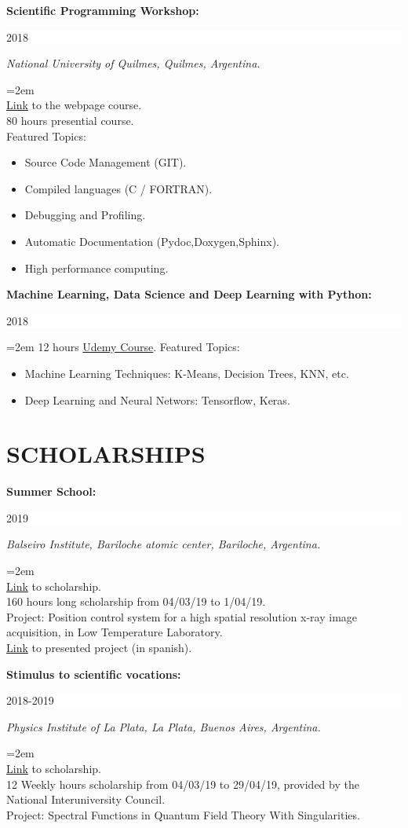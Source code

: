 \documentclass[paper=letter,fontsize=11pt]{scrartcl} %
\newcommand{\sepspace}{\vspace*{1em}}		%
\newcommand{\NewPart}[2]{\section*{\uppercase{#1} \small \normalfont #2}}
\newcommand{\EducationEntry}[4]{
		\noindent \textbf{#1} \hfill      %
		\colorbox{White}{%
			\parbox{6em}{%
			\hfill\color{Black}#2}} \par  %
		\noindent \textit{#3} \par        %
		\noindent\hangindent=2em\hangafter=0 \small #4 %
		\normalsize \par}
\begin{document}
\EducationEntry{Scientific Programming Workshop:
}{2018}{National University of Quilmes, Quilmes, Argentina.}{\\
{\href{https://wtpc.github.io/}{Link}} to the webpage course.\\
80 hours presential course.\\
Featured Topics:



\begin{itemize}
	\item{Source Code Management (GIT).}
	\item{Compiled languages (C / FORTRAN).}
	\item{Debugging and Profiling.}
	\item{Automatic Documentation (Pydoc,Doxygen,Sphinx).}
	\item{High performance computing.}
	\end{itemize}}
\sepspace

\EducationEntry{Machine Learning, Data Science and Deep Learning with Python:
}{2018}{}{
12 hours {\href{https://www.udemy.com/data-science-and-machine-learning-with-python-hands-on/}{Udemy Course}}.
Featured Topics:
\begin{itemize}
\item{Machine Learning Techniques: K-Means, Decision Trees, KNN, etc. }
\item{Deep Learning and Neural Networs: Tensorflow, Keras.}
\end{itemize}
}


\sepspace

\NewPart{Scholarships}{}

\EducationEntry{Summer School:}
{2019}
{Balseiro Institute, Bariloche atomic center, Bariloche, Argentina.}{\\
{\href{http://www.ib.edu.ar/component/k2/item/452-becas-de-verano.html}{Link}} to scholarship.
\\ 160 hours long scholarship from 04/03/19 to 1/04/19. \\ 
Project: Position control system for a high spatial resolution x-ray image acquisition, in Low Temperature Laboratory.\\
{\href{https://drive.google.com/drive/folders/1y01BjDnIPS2QOX3Vo68r9A8HA9tstj1S}{Link}} to presented project (in spanish).
}

\sepspace

\EducationEntry{Stimulus to scientific vocations:}
{2018-2019}
{Physics Institute of La Plata, La Plata, Buenos Aires, Argentina.}
{\\
{\href{http://evc.cin.edu.ar/}{Link}} to scholarship.
\\ 12 Weekly hours scholarship from 04/03/19 to 29/04/19, provided by the National Interuniversity Council. \\ 
Project: Spectral Functions in Quantum Field Theory With Singularities.
}
\end{document}
